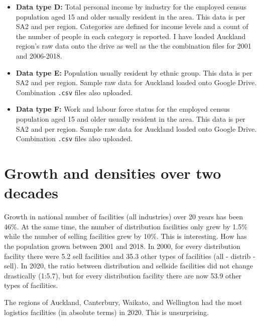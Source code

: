 \documentclass[3p, a4paper, authoryear, 11pt, fleqn, review]{elsarticle}
\newcommand{\nmt}[1]{{\color{red}{~(nmt: #1)}}}
\begin{document}
\begin{itemize}
\item \textbf{Data type D:} Total personal income by industry for the employed census population aged 15 and older usually resident in the area. This data is per \ac{SA2} and per region. Categories are defined for income levels and a count of the number of people in each category is reported. I have loaded Auckland region's raw data onto the drive as well as the the combination files for 2001 and 2006-2018. \nmt{In hindsight, I think household income would be a better variable than personal income when measuring the poverty or affluence of a community. What do you think? This data is available, just needs to be downloaded.}
\item \textbf{Data type E:} Population usually resident by ethnic group. This data is per \ac{SA2} and per region. Sample raw data for Auckland loaded onto Google Drive. Combination \texttt{.csv} files also uploaded.  
\item \textbf{Data type F:} Work and labour force status for the employed census population aged 15 and older usually resident in the area. This data is per \ac{SA2} and per region. Sample raw data for Auckland loaded onto Google Drive. Combination \texttt{.csv} files also uploaded.
\end{itemize}

\section{Growth and densities over two decades}

Growth in national number of facilities (all industries) over 20 years has been 46\%. At the same time, the number of distribution facilities only grew by 1.5\% while the number of selling facilities grew by 10\%. This is interesting. How has the population grown between 2001 and 2018. In 2000, for every distribution facility there were 5.2 sell facilities and 35.3 other types of facilities (all - distrib - sell). In 2020, the ratio between distribution and sellside facilities did not change drastically (1:5.7), but for every distribution facility there are now 53.9 other types of facilities. \nmt{What is the significance of that?} 

The regions of Auckland, Canterbury, Waikato, and Wellington had the most logistics facilities (in absolute terms) in 2020. This is unsurprising. 
\end{document}

